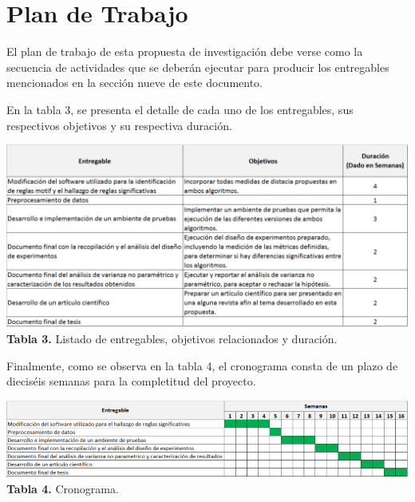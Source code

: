 \section{\textbf{Plan de Trabajo}}
El plan de trabajo de esta propuesta de investigaci\'on debe verse como la secuencia de actividades que se deber\'an ejecutar para producir los entregables mencionados en la secci\'on nueve de este documento.\par
En la tabla 3, se presenta el detalle de cada uno de los entregables, sus respectivos objetivos y su respectiva duraci\'on.\par
\begin{center}
\includegraphics[scale=0.65]{deliverables.png}
\vspace*{10pt}
\footnotesize{\textbf{Tabla 3.} Listado de entregables, objetivos relacionados y duraci\'on.}
\end{center}
Finalmente, como se observa en la tabla 4, el cronograma consta de un plazo de diecis\'eis semanas para la completitud del proyecto.
\begin{center}
\includegraphics[scale=0.85]{projectPlan.png}
\vspace*{10pt}
\footnotesize{\textbf{Tabla 4.} Cronograma.}
\end{center}

